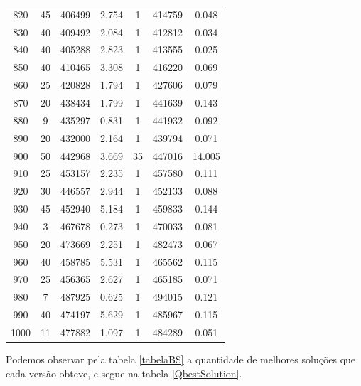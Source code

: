 \documentclass[a4paper,12pt]{article}
\begin{document}
\begin{center}
\begin{longtable}{|c|c|c|c|c|c|c|}
820   &   45   &   406499   &   2.754   &   1   &   414759   &   0.048  \\
830   &   40   &   409492   &   2.084   &   1   &   412812   &   0.034  \\
840   &   40   &   405288   &   2.823   &   1   &   413555   &   0.025  \\
850   &   40   &   410465   &   3.308   &   1   &   416220   &   0.069  \\
860   &   25   &   420828   &   1.794   &   1   &   427606   &   0.079  \\
870   &   20   &   438434   &   1.799   &   1   &   441639   &   0.143  \\
880   &   9   &   435297   &   0.831   &   1   &   441932   &   0.092  \\
890   &   20   &   432000   &   2.164   &   1   &   439794   &   0.071  \\
900   &   50   &   442968   &   3.669   &   35   &   447016   &   14.005  \\
910   &   25   &   453157   &   2.235   &   1   &   457580   &   0.111  \\
920   &   30   &   446557   &   2.944   &   1   &   452133   &   0.088  \\
930   &   45   &   452940   &   5.184   &   1   &   459833   &   0.144  \\
940   &   3   &   467678   &   0.273   &   1   &   470033   &   0.081  \\
950   &   20   &   473669   &   2.251   &   1   &   482473   &   0.067  \\
960   &   40   &   458785   &   5.531   &   1   &   465562   &   0.115  \\
970   &   25   &   456365   &   2.627   &   1   &   465185   &   0.071  \\
980   &   7   &   487925   &   0.625   &   1   &   494015   &   0.121  \\
990   &   40   &   474197   &   5.629   &   1   &   485967   &   0.115  \\
1000   &   11   &   477882   &   1.097   &   1   &   484289   &   0.051  \\

\end{longtable}

\restoregeometry%

\end{center}


Podemos observar pela tabela \ref{tabelaBS} a quantidade de melhores soluções que cada versão obteve, 
e segue na tabela \ref{QbestSolution}.
\end{document}

